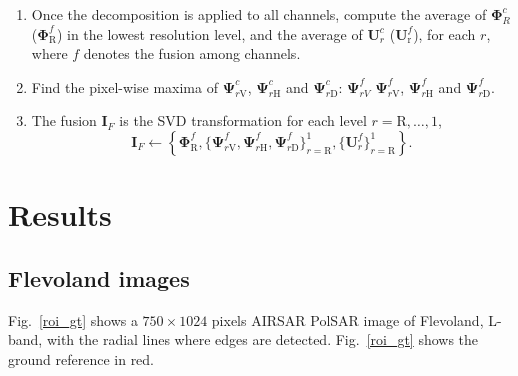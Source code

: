 \documentclass[journal]{IEEEtran}
\begin{document}
\begin{enumerate}
\item Once the decomposition is applied to all channels, 
compute the average of $\bm\Phi_R^c$ ($\bm\Phi_\text{R}^f$) in the lowest resolution level, and the average 
of $\bm U_r^c$ ($\bm U_\text{r}^f$), for each $r$, where $f$ denotes the fusion among channels. 
\item Find the pixel-wise maxima of $\bm\Psi_{r\text{V}}^c$, $\bm\Psi_{r\text{H}}^c$ and $\bm\Psi_{r\text{D}}^c$: $ \bm\Psi_{rV}^f$ $\bm\Psi_{r\text{V}}^f$, $\bm\Psi_{r\text{H}}^f$ and $\bm\Psi_{r\text{D}}^f$.
\item The fusion $\bm I_F$ is the SVD transformation for each level $r=\text{R},\dots,1$,  
\begin{equation}\nonumber
\bm I_F\leftarrow \left\{\bm \Phi_\text{R}^f,\{\bm\Psi_{r\text{V}}^f,\bm\Psi_{r\text{H}}^f,\bm\Psi_{r\text{D}}^f \}_{r=\text{R}}^1,\{\bm U_r^f\}_{r=\text{R}}^1 \right\}.
\end{equation}
\end{enumerate}

\section{Results}\label{sec_05}

\subsection{Flevoland images}

Fig.~\ref{roi_gt} shows a $750\times 1024$ pixels AIRSAR PolSAR image of Flevoland, L-band, with the radial lines where edges are detected. 
Fig.~\ref{roi_gt} shows the ground reference in red.  
\end{document}
